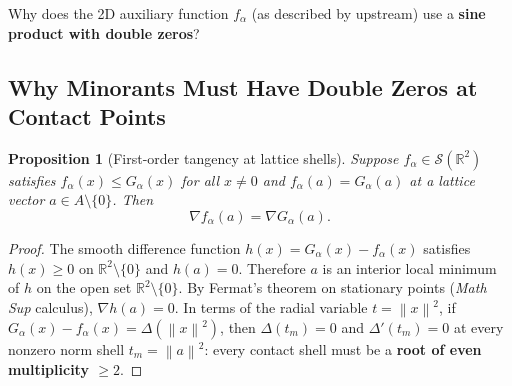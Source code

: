 \documentclass[11pt, a4paper]{article}
\newtheorem{proposition}[theorem]{Proposition}
\theoremstyle{definition}
\theoremstyle{remark}
\newcommand{\R}{\mathbb{R}}
\newcommand{\Scal}{\mathcal{S}}
\newcommand{\norm}[1]{\left\lVert #1 \right\rVert}
\begin{document}
Why does the 2D auxiliary function $f_\alpha$ (as described by upstream) use a \textbf{sine product with double zeros}?

\subsection{Why Minorants Must Have Double Zeros at Contact Points}
\begin{proposition}[First-order tangency at lattice shells]
Suppose $f_\alpha \in \Scal(\R^2)$ satisfies $f_\alpha(x) \le G_\alpha(x)$ for all $x \neq 0$ and $f_\alpha(a) = G_\alpha(a)$ at a lattice vector $a \in A \setminus \{0\}$. Then
\[
\nabla f_\alpha(a) = \nabla G_\alpha(a).
\]
\end{proposition}
\begin{proof}
The smooth difference function $h(x) = G_\alpha(x) - f_\alpha(x)$ satisfies $h(x) \ge 0$ on $\R^2 \setminus \{0\}$ and $h(a) = 0$. Therefore $a$ is an interior local minimum of $h$ on the open set $\R^2 \setminus \{0\}$. By Fermat's theorem on stationary points (\textit{Math Sup} calculus), $\nabla h(a) = 0$. In terms of the radial variable $t = \norm{x}^2$, if $G_\alpha(x) - f_\alpha(x) = \Delta(\norm{x}^2)$, then $\Delta(t_m) = 0$ and $\Delta'(t_m) = 0$ at every nonzero norm shell $t_m = \norm{a}^2$: every contact shell must be a \textbf{root of even multiplicity $\ge 2$}.
\end{proof}
\end{document}
